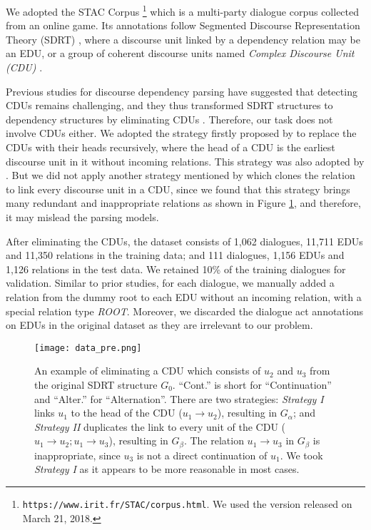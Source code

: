 \documentclass[letterpaper]{article} \usepackage{aaai19}  \usepackage{times}  \usepackage{helvet}  \usepackage{courier}  \usepackage{url}  \usepackage{graphicx}  \usepackage{amssymb}
\begin{document}
We adopted the STAC Corpus \cite{STACcorpus}\footnote{\texttt{https://www.irit.fr/STAC/corpus.html}. We used the version released on March 21, 2018.} which is a multi-party dialogue corpus collected from an online game.
Its annotations follow Segmented Discourse Representation Theory (SDRT) \cite{asher2003logics}, where a discourse unit linked by a dependency relation may be an EDU, or a group of coherent discourse units named \emph{Complex Discourse Unit (CDU)} \cite{STACcorpus}.

Previous studies for discourse dependency parsing have suggested that detecting CDUs remains challenging, and they thus transformed SDRT structures to dependency structures by eliminating CDUs \cite{muller2012constrained,afantenos2015discourse,perret2016integer}. 
Therefore, our task does not involve CDUs either. 
We adopted the strategy firstly proposed by \cite{muller2012constrained} to replace the CDUs with their heads recursively, where the head of a CDU is the earliest discourse unit in it without incoming relations. This strategy was also adopted by \cite{afantenos2015discourse,perret2016integer}.
But we did not apply another strategy mentioned by \cite{perret2016integer} which clones the relation to link every discourse unit in a CDU, since we found that this strategy brings many redundant and inappropriate relations as shown in Figure \ref{dataset}, and therefore, it may mislead the parsing models.

After eliminating the CDUs, the dataset consists of 1,062 dialogues, 11,711 EDUs and 11,350 relations in the training data; and 111 dialogues, 1,156 EDUs and 1,126 relations in the test data. We retained 10\% of the training dialogues for validation.
Similar to prior studies, for each dialogue, we manually added a relation from the dummy root to each EDU without an incoming relation, with a special relation type \emph{ROOT}.
Moreover, we discarded the dialogue act annotations on EDUs in the original dataset as they are irrelevant to our problem.

\begin{figure}[ht]
    \centering
    \texttt{[image: data\_pre.png]}
    \caption{
    An example of eliminating a CDU which consists of $u_2$ and $u_3$ from the original SDRT structure $G_0$. ``Cont.'' is short for ``Continuation'' and ``Alter.'' for ``Alternation''. There are two strategies: \emph{Strategy I} links $u_1$ to the head of the CDU ($u_1\rightarrow u_2$), resulting in $G_{\alpha}$; and \emph{Strategy II} duplicates the link to every unit of the CDU ($u_1\rightarrow u_2;u_1\rightarrow u_3$), resulting in $G_{\beta}$.
    The relation $u_1\rightarrow u_3$ in $G_{\beta}$ is inappropriate, since $u_3$ is not a direct continuation of $u_1$.
    We took \emph{Strategy I} as it appears to be more reasonable in most cases.
    }
    \label{dataset}
\end{figure}
\end{document}
